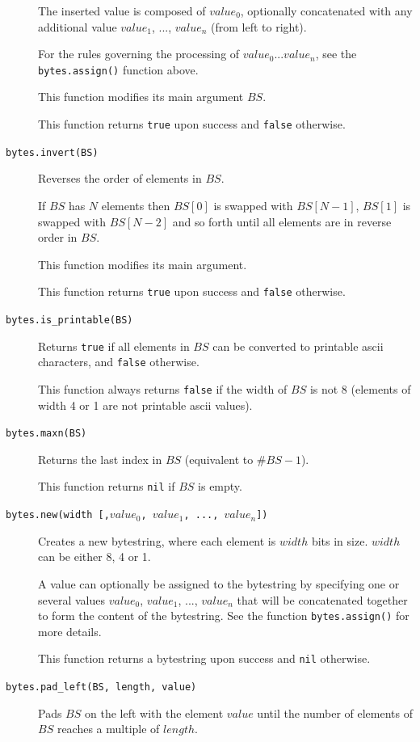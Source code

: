 \documentclass[11pt]{report}
\begin{document}
\begin{description}
{  The inserted value is composed of $value_0$, optionally concatenated with
  any additional value $value_1$, ..., $value_n$ (from left to right).

  For the rules governing the processing of $value_0 ... value_n$, see
  the \texttt{bytes.assign()} function above.

  This function modifies its main argument $BS$.
  
  This function returns \texttt{true} upon success and \texttt{false} otherwise.
}

\item[\texttt{bytes.invert(BS)}]
{
  Reverses the order of elements in $BS$.

  If $BS$ has $N$ elements then $BS[0]$ is swapped with $BS[N-1]$,
  $BS[1]$ is swapped with $BS[N-2]$ and so forth until all elements are
  in reverse order in $BS$.

  This function modifies its main argument.

  This function returns \texttt{true} upon success and \texttt{false} otherwise.
}

\item[\texttt{bytes.is\_printable(BS)}]
{
  Returns \texttt{true} if all elements in $BS$ can be converted to 
  printable ascii characters, and \texttt{false} otherwise.

  This function always returns \texttt{false} if the width of $BS$ is 
  not 8 (elements of width 4 or 1 are not printable ascii values).  
}

\item[\texttt{bytes.maxn(BS)}]
{
  Returns the last index in $BS$ (equivalent to $\#BS-1$).

  This function returns \texttt{nil} if $BS$ is empty.
}

\item[\texttt{bytes.new(width [,$value_0$, $value_1$, ..., $value_n$])}]
{
  Creates a new bytestring, where each element is $width$ bits in size.
  $width$ can be either 8, 4 or 1.

  A value can optionally be assigned to the bytestring by specifying one or 
  several values $value_0$, $value_1$, ..., $value_n$ that will be concatenated
  together to form the content of the bytestring. See the function 
  \texttt{bytes.assign()} for more details.

  This function returns a bytestring upon success and \texttt{nil} otherwise. 
}

\item[\texttt{bytes.pad\_left(BS, length, value)}]
{
  Pads $BS$ on the left with the element $value$ until the number of elements 
  of $BS$ reaches a multiple of $length$.

}
\end{description}
\end{document}
